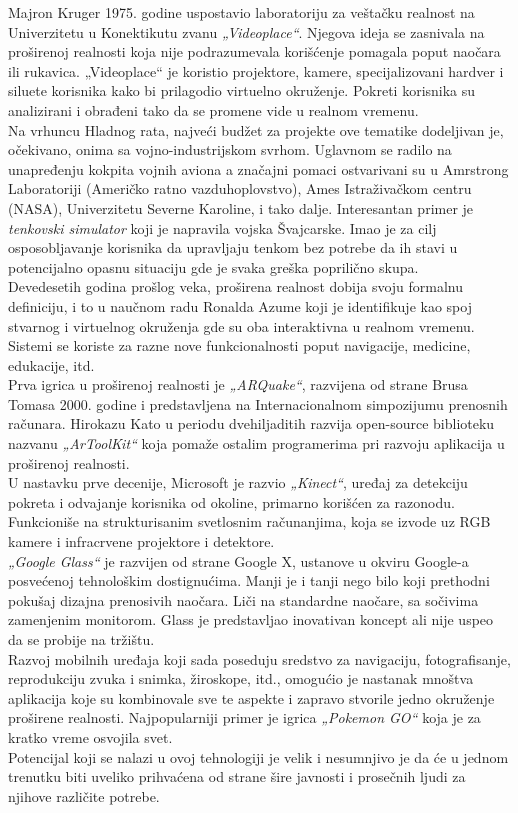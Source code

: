 \documentclass[a4paper]{article}
\begin{document}
	Majron Kruger 1975. godine uspostavio laboratoriju za veštačku realnost na Univerzitetu u Konektikutu zvanu \emph{„Videoplace“}. 
	Njegova ideja se zasnivala na proširenoj realnosti koja nije podrazumevala korišćenje pomagala poput naočara ili rukavica. „Videoplace“ je koristio projektore, kamere, 
	specijalizovani hardver i siluete korisnika kako bi prilagodio virtuelno okruženje. Pokreti korisnika su analizirani i obrađeni tako da se promene vide u realnom vremenu.\\
    Na vrhuncu Hladnog rata, najveći budžet za projekte ove tematike dodeljivan je, očekivano, onima sa vojno-industrijskom svrhom. Uglavnom se radilo na unapređenju kokpita 
	vojnih aviona a značajni pomaci ostvarivani su u Amrstrong Laboratoriji (Američko ratno vazduhoplovstvo), Ames Istraživačkom centru (NASA), Univerzitetu Severne Karoline, i tako dalje.\cite{Istorija 2}
	Interesantan primer je \emph{tenkovski simulator} koji je napravila vojska Švajcarske. Imao je za cilj osposobljavanje korisnika da upravljaju tenkom bez potrebe
	 da ih stavi u potencijalno opasnu situaciju gde je svaka greška poprilično skupa.\\
    Devedesetih godina prošlog veka, proširena realnost dobija svoju formalnu definiciju, i to u naučnom radu Ronalda Azume koji je identifikuje kao spoj stvarnog i virtuelnog okruženja
	 gde su oba interaktivna u realnom vremenu. \cite{Istorija 3} Sistemi se koriste za razne nove funkcionalnosti poput navigacije, medicine, edukacije, itd.\\
    Prva igrica u proširenoj realnosti je \emph{„ARQuake“}, razvijena od strane Brusa Tomasa 2000. godine i predstavljena na Internacionalnom simpozijumu prenosnih računara.
	 Hirokazu Kato u periodu dvehiljaditih razvija open-source biblioteku nazvanu \emph{„ArToolKit“} koja pomaže ostalim programerima pri razvoju aplikacija u proširenoj realnosti.\\ 
    U nastavku prve decenije, Microsoft je razvio \emph{„Kinect“}, uređaj za detekciju pokreta i odvajanje korisnika od okoline, primarno korišćen za razonodu. 
	Funkcioniše na strukturisanim svetlosnim računanjima, koja se izvode uz RGB kamere i infracrvene projektore i detektore.\\
    \emph{„Google Glass“} je razvijen od strane Google X, ustanove u okviru Google-a posvećenoj tehnološkim dostignućima. Manji je i tanji nego bilo koji prethodni pokušaj
	 dizajna prenosivih naočara. Liči na standardne naočare, sa sočivima zamenjenim monitorom. Glass je predstavljao inovativan koncept ali nije uspeo da se probije na tržištu.\\
    Razvoj mobilnih uređaja koji sada poseduju sredstvo za navigaciju, fotografisanje, reprodukciju zvuka i snimka, žiroskope, itd., omogućio je nastanak mnoštva aplikacija
	 koje su kombinovale sve te aspekte i zapravo stvorile jedno okruženje proširene realnosti. Najpopularniji primer je igrica \emph{„Pokemon GO“ }koja je za kratko vreme osvojila svet.\\ 
    Potencijal koji se nalazi u ovoj tehnologiji je velik i nesumnjivo je da će u jednom trenutku biti uveliko prihvaćena od strane šire javnosti i prosečnih ljudi za njihove 
	različite potrebe.
	
\end{document}
